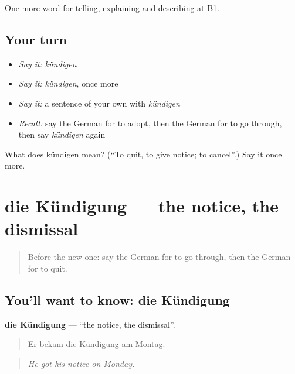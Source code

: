 \begin{grammarlens}[title={What you've built}]
One more word for telling, explaining and describing at B1.
\end{grammarlens}

\subsection*{Your turn}
\begin{itemize}
\raggedright
  \item \emph{Say it:} \emph{kündigen}
  \item \emph{Say it:} \emph{kündigen}, once more
  \item \emph{Say it:} a sentence of your own with \emph{kündigen}
  \item \emph{Recall:} say the German for to adopt, then the German for to go through, then say \emph{kündigen} again
\end{itemize}

\begin{tcolorbox}[breakable,colback=teal!4,colframe=teal!35!black,title={Before you move on}]
What does kündigen mean? (\textquotedblleft{}To quit, to give notice; to cancel\textquotedblright{}.) Say it once more.
\end{tcolorbox}
\section[die Kündigung]{die Kündigung — the notice, the dismissal}

\label{lesson:GE-C301-kuendigung}



\begin{quote}
Before the new one: say the German for to go through, then the German for to quit.
\end{quote}

\subsection*{You'll want to know: die Kündigung}
\textbf{die Kündigung} — \textquotedblleft{}the notice, the dismissal\textquotedblright{}.

\begin{quote}
Er bekam die Kündigung am Montag.
\end{quote}

\begin{quote}
\emph{He got his notice on Monday.}
\end{quote}

